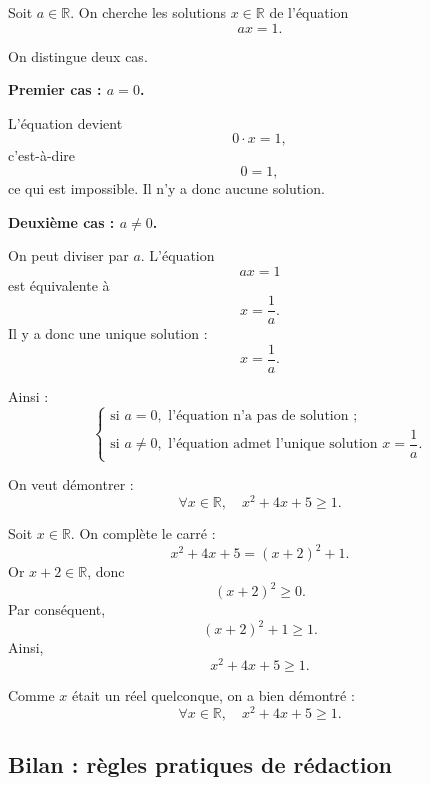\documentclass[11pt,a4paper]{article}
\begin{document}
\begin{preuvebox}[title={Correction de l'exercice 4}]

Soit $a\in\mathbb{R}$. On cherche les solutions $x\in\mathbb{R}$ de l'équation
\[
ax=1.
\]

On distingue deux cas.

\medskip

\textbf{Premier cas : $a=0$.}

L'équation devient
\[
0\cdot x=1,
\]
c'est-à-dire
\[
0=1,
\]
ce qui est impossible. Il n'y a donc aucune solution.

\medskip

\textbf{Deuxième cas : $a\neq 0$.}

On peut diviser par $a$. L'équation
\[
ax=1
\]
est équivalente à
\[
x=\frac{1}{a}.
\]
Il y a donc une unique solution :
\[
x=\frac{1}{a}.
\]

Ainsi :
\[
\boxed{
\begin{cases}
\text{si } a=0, \text{ l'équation n'a pas de solution ;}\\
\text{si } a\neq 0, \text{ l'équation admet l'unique solution } x=\dfrac{1}{a}.
\end{cases}
}
\]

\end{preuvebox}

\begin{preuvebox}[title={Correction de l'exercice 5}]

On veut démontrer :
\[
\forall x\in\mathbb{R},\quad x^2+4x+5\geq 1.
\]

Soit $x\in\mathbb{R}$. On complète le carré :
\[
x^2+4x+5=(x+2)^2+1.
\]
Or $x+2\in\mathbb{R}$, donc
\[
(x+2)^2\geq 0.
\]
Par conséquent,
\[
(x+2)^2+1\geq 1.
\]
Ainsi,
\[
x^2+4x+5\geq 1.
\]

Comme $x$ était un réel quelconque, on a bien démontré :
\[
\forall x\in\mathbb{R},\quad x^2+4x+5\geq 1.
\]

\end{preuvebox}

\subsection{Bilan : règles pratiques de rédaction}
\end{document}
